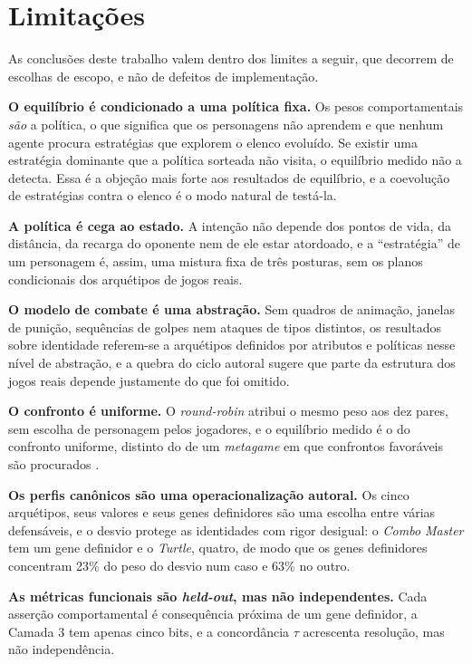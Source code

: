 \section{Limitações}
\label{sec: limitacoes}

As conclusões deste trabalho valem dentro dos limites a seguir, que decorrem de escolhas de escopo, e não de defeitos de implementação.

\textbf{O equilíbrio é condicionado a uma política fixa.} Os pesos comportamentais \textit{são} a política, o que significa que os personagens não aprendem e que nenhum agente procura estratégias que explorem o elenco evoluído. Se existir uma estratégia dominante que a política sorteada não visita, o equilíbrio medido não a detecta. Essa é a objeção mais forte aos resultados de equilíbrio, e a coevolução de estratégias contra o elenco \cite{leigh2008coevolution} é o modo natural de testá-la.

\textbf{A política é cega ao estado.} A intenção não depende dos pontos de vida, da distância, da recarga do oponente nem de ele estar atordoado, e a ``estratégia'' de um personagem é, assim, uma mistura fixa de três posturas, sem os planos condicionais dos arquétipos de jogos reais.

\textbf{O modelo de combate é uma abstração.} Sem quadros de animação, janelas de punição, sequências de golpes nem ataques de tipos distintos, os resultados sobre identidade referem-se a arquétipos definidos por atributos e políticas nesse nível de abstração, e a quebra do ciclo autoral sugere que parte da estrutura dos jogos reais depende justamente do que foi omitido.

\textbf{O confronto é uniforme.} O \textit{round-robin} atribui o mesmo peso aos dez pares, sem escolha de personagem pelos jogadores, e o equilíbrio medido é o do confronto uniforme, distinto do de um \textit{metagame} em que confrontos favoráveis são procurados \cite{sirlin2006playing}.

\textbf{Os perfis canônicos são uma operacionalização autoral.} Os cinco arquétipos, seus valores e seus genes definidores são uma escolha entre várias defensáveis, e o desvio protege as identidades com rigor desigual: o \textit{Combo Master} tem um gene definidor e o \textit{Turtle}, quatro, de modo que os genes definidores concentram 23\% do peso do desvio num caso e 63\% no outro.

\textbf{As métricas funcionais são \textit{held-out}, mas não independentes.} Cada asserção comportamental é consequência próxima de um gene definidor, a Camada 3 tem apenas cinco bits, e a concordância $\tau$ acrescenta resolução, mas não independência.

